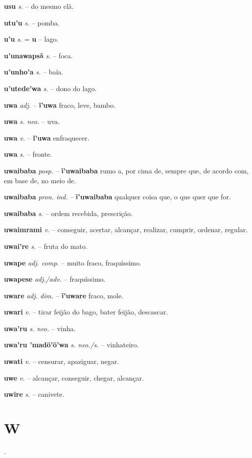 \textbf{usu} \textit{s.} -- do mesmo clã.

\textbf{utu'u} \textit{s.} -- pomba.

\textbf{u'u} \textit{s.} = \textbf{u} -- lago.

\textbf{u'unawapsã} \textit{s.} -- foca.

\textbf{u'unho'a} \textit{s.} -- baía.

\textbf{u'utede'wa} \textit{s.} -- dono do lago.

\textbf{uwa} \textit{adj.} -- \textbf{ĩ'uwa} fraco, leve, bambo.

\textbf{uwa} \textit{s. neo.} -- uva.

\textbf{uwa} \textit{v.} -- \textbf{l'uwa} enfraquecer.

\textbf{uwa} \textit{s.} -- fronte.

\textbf{uwaibaba} \textit{posp.} -- \textbf{ĩ'uwaibaba} rumo a, por cima de, sempre que, de acordo com, em base de, no meio de.

\textbf{uwaibaba} \textit{pron. ind.} -- \textbf{ĩ'uwaibaba} qualquer coisa que, o que quer que for.

\textbf{uwaibaba} \textit{s.} -- ordem recebida, prescrição.

\textbf{uwaimrami} \textit{v.} -- conseguir, acertar, alcançar, realizar, cumprir, ordenar, regular.

\textbf{uwai're} \textit{s.} -- fruta do mato.

\textbf{uwape} \textit{adj. comp.} -- muito fraco, fraquíssimo.

\textbf{uwapese} \textit{adj./adv.} -- fraquíssimo.

\textbf{uware} \textit{adj. dim.} -- \textbf{ĩ'uware} fraco, mole.

\textbf{uwari} \textit{v.} -- tirar feijão do bago, bater feijão, descascar.

\textbf{uwa'ru} \textit{s. neo.} -- vinha.

\textbf{uwa'ru 'madö'ö'wa} \textit{s. neo./s.} -- vinhateiro.

\textbf{uwati} \textit{v.} -- censurar, apaziguar, negar.

\textbf{uwe} \textit{v.} -- alcançar, conseguir, chegar, alcançar.

\textbf{uwire} \textit{s.} -- canivete.


\section*{W}.




